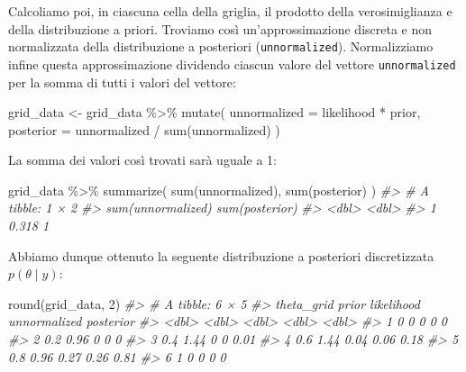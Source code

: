 \documentclass[
  10pt,
  italian,
  a4paper,
  extrafontsizes,onecolumn,openright
  ]{memoir}
\newenvironment{Shaded}{\begin{snugshade}}{\end{snugshade}}
\newcommand{\AttributeTok}[1]{\textcolor[rgb]{0.77,0.63,0.00}{#1}}
\newcommand{\CommentTok}[1]{\textcolor[rgb]{0.56,0.35,0.01}{\textit{#1}}}
\newcommand{\DecValTok}[1]{\textcolor[rgb]{0.00,0.00,0.81}{#1}}
\newcommand{\FunctionTok}[1]{\textcolor[rgb]{0.00,0.00,0.00}{#1}}
\newcommand{\NormalTok}[1]{#1}
\newcommand{\OtherTok}[1]{\textcolor[rgb]{0.56,0.35,0.01}{#1}}
\newcommand{\SpecialCharTok}[1]{\textcolor[rgb]{0.00,0.00,0.00}{#1}}
\begin{document}
\noindent
Calcoliamo poi, in ciascuna cella della griglia, il prodotto della verosimiglianza e della distribuzione a priori. Troviamo così un'approssimazione discreta e non normalizzata della distribuzione a posteriori (\texttt{unnormalized}). Normalizziamo infine questa approssimazione dividendo ciascun valore del vettore \texttt{unnormalized} per la somma di tutti i valori del vettore:

\begin{Shaded}
\begin{Highlighting}[]
\NormalTok{grid\_data }\OtherTok{\textless{}{-}}\NormalTok{ grid\_data }\SpecialCharTok{\%\textgreater{}\%}
  \FunctionTok{mutate}\NormalTok{(}
    \AttributeTok{unnormalized =}\NormalTok{ likelihood }\SpecialCharTok{*}\NormalTok{ prior,}
    \AttributeTok{posterior =}\NormalTok{ unnormalized }\SpecialCharTok{/} \FunctionTok{sum}\NormalTok{(unnormalized)}
\NormalTok{  )}
\end{Highlighting}
\end{Shaded}

\noindent
La somma dei valori così trovati sarà uguale a 1:

\begin{Shaded}
\begin{Highlighting}[]
\NormalTok{grid\_data }\SpecialCharTok{\%\textgreater{}\%}
  \FunctionTok{summarize}\NormalTok{(}
    \FunctionTok{sum}\NormalTok{(unnormalized),}
    \FunctionTok{sum}\NormalTok{(posterior)}
\NormalTok{  )}
\CommentTok{\#\textgreater{} \# A tibble: 1 × 2}
\CommentTok{\#\textgreater{}   \textasciigrave{}sum(unnormalized)\textasciigrave{} \textasciigrave{}sum(posterior)\textasciigrave{}}
\CommentTok{\#\textgreater{}                 \textless{}dbl\textgreater{}            \textless{}dbl\textgreater{}}
\CommentTok{\#\textgreater{} 1               0.318                1}
\end{Highlighting}
\end{Shaded}

\noindent
Abbiamo dunque ottenuto la seguente distribuzione a posteriori discretizzata \(p(\theta \mid y)\):

\begin{Shaded}
\begin{Highlighting}[]
\FunctionTok{round}\NormalTok{(grid\_data, }\DecValTok{2}\NormalTok{)}
\CommentTok{\#\textgreater{} \# A tibble: 6 × 5}
\CommentTok{\#\textgreater{}   theta\_grid prior likelihood unnormalized posterior}
\CommentTok{\#\textgreater{}        \textless{}dbl\textgreater{} \textless{}dbl\textgreater{}      \textless{}dbl\textgreater{}        \textless{}dbl\textgreater{}     \textless{}dbl\textgreater{}}
\CommentTok{\#\textgreater{} 1        0    0          0            0         0   }
\CommentTok{\#\textgreater{} 2        0.2  0.96       0            0         0   }
\CommentTok{\#\textgreater{} 3        0.4  1.44       0            0         0.01}
\CommentTok{\#\textgreater{} 4        0.6  1.44       0.04         0.06      0.18}
\CommentTok{\#\textgreater{} 5        0.8  0.96       0.27         0.26      0.81}
\CommentTok{\#\textgreater{} 6        1    0          0            0         0}
\end{Highlighting}
\end{Shaded}
\end{document}
